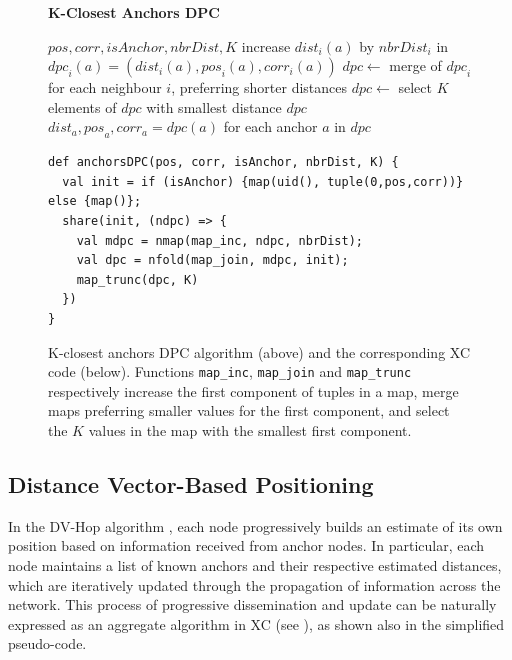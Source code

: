 \documentclass[runningheads]{llncs}
\begin{document}
\begin{figure}[t]
\textbf{K-Closest Anchors DPC}
\begin{algorithmic}[1]
    \Require $\mathit{pos}, \mathit{corr}, \mathit{isAnchor}, \mathit{nbrDist}, \mathit{K}$
            \State increase $\mathit{dist}_i(a)$ by $\mathit{nbrDist}_i$ in $\mathit{dpc}_i(a) = (\mathit{dist}_i(a), \mathit{pos}_i(a), \mathit{corr}_i(a))$
        \EndForEach 
        \State $\mathit{dpc} \gets$ merge of $\mathit{dpc}_i$ for each neighbour $i$, preferring shorter distances
            \State $\mathit{dpc} \gets$ select $K$ elements of $\mathit{dpc}$ with smallest distance
        \EndIf
        \State \Return $\mathit{dpc}$
    \EndShare
    \State \Return $\mathit{dist}_a, \mathit{pos}_a, \mathit{corr}_a = \mathit{dpc}(a)$ for each anchor $a$ in $\mathit{dpc}$
\end{algorithmic}
\medskip
\begin{lstlisting}[language=xc,mathescape]
def anchorsDPC(pos, corr, isAnchor, nbrDist, K) {
  val init = if (isAnchor) {map(uid(), tuple(0,pos,corr))} else {map()};
  share(init, (ndpc) => {
    val mdpc = nmap(map_inc, ndpc, nbrDist);
    val dpc = nfold(map_join, mdpc, init);
    map_trunc(dpc, K)
  })
}
\end{lstlisting}
    \caption{K-closest anchors DPC algorithm (above) and the corresponding XC code (below). Functions \lstinline|map_inc|, \lstinline|map_join| and \lstinline|map_trunc| respectively increase the first component of tuples in a map, merge maps preferring smaller values for the first component, and select the $K$ values in the map with the smallest first component.}
    \label{code:kclose}
\end{figure}

\subsection{Distance Vector-Based Positioning}

In the DV-Hop algorithm \cite{DBLP:journals/telsys/NiculescuN03}, each node progressively builds an estimate of its own position based on information received from anchor nodes. In particular, each node maintains a list of known anchors and their respective estimated distances, which are iteratively updated through the propagation of information across the network. This process of progressive dissemination and update can be naturally expressed as an aggregate algorithm in XC (see ), as shown also in the simplified pseudo-code.
\end{document}
